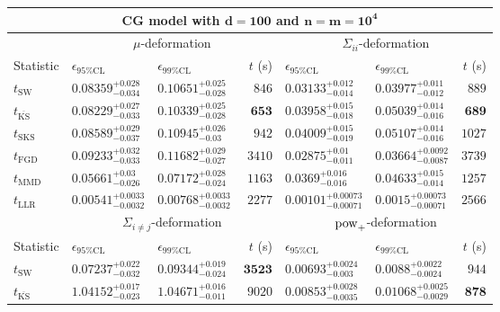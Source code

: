 \begin{tabular}{l|llr|llr}
	\toprule
	\multicolumn{7}{c}{{\bf CG model with $\mathbf{d=100}$ and $\mathbf{n=m=10^{4}}$}} \\
	\toprule
	\multicolumn{1}{c}{} & \multicolumn{3}{c}{$\mu$-deformation} & \multicolumn{3}{c}{$\Sigma_{ii}$-deformation} \\
	Statistic & $\epsilon_{95\%\mathrm{CL}}$ & $\epsilon_{99\%\mathrm{CL}}$ & $t$ (s) & $\epsilon_{95\%\mathrm{CL}}$ & $\epsilon_{99\%\mathrm{CL}}$ & $t$ (s) \\
	\midrule
	$t_{\mathrm{SW}}$ & $0.08359_{-0.034}^{+0.028}$ & $0.10651_{-0.028}^{+0.025}$ & $846$ & $0.03133_{-0.014}^{+0.012}$ & $0.03977_{-0.012}^{+0.011}$ & $889$ \\
	$t_{\overline{\mathrm{KS}}}$ & $0.08229_{-0.033}^{+0.027}$ & $0.10339_{-0.028}^{+0.025}$ & ${\mathbf{653}}$ & $0.03958_{-0.018}^{+0.015}$ & $0.05039_{-0.016}^{+0.014}$ & ${\mathbf{689}}$ \\
	$t_{\mathrm{SKS}}$ & $0.08589_{-0.037}^{+0.029}$ & $0.10945_{-0.03}^{+0.026}$ & $942$ & $0.04009_{-0.019}^{+0.015}$ & $0.05107_{-0.016}^{+0.014}$ & $1027$ \\
	$t_{\mathrm{FGD}}$ & $0.09233_{-0.033}^{+0.032}$ & $0.11682_{-0.027}^{+0.029}$ & $3410$ & ${\mathbf{0.02875_{-0.011}^{+0.01}}}$ & ${\mathbf{0.03664_{-0.0087}^{+0.0092}}}$ & $3739$ \\
	$t_{\mathrm{MMD}}$ & ${\mathbf{0.05661_{-0.026}^{+0.03}}}$ & ${\mathbf{0.07172_{-0.024}^{+0.028}}}$ & $1163$ & $0.0369_{-0.016}^{+0.016}$ & $0.04633_{-0.014}^{+0.015}$ & $1257$ \\
	$t_{\mathrm{LLR}}$ & $0.00541_{-0.0032}^{+0.0033}$ & $0.00768_{-0.0032}^{+0.0033}$ & $2277$ & $0.00101_{-0.00071}^{+0.00073}$ & $0.0015_{-0.00071}^{+0.00073}$ & $2566$ \\
	\toprule
	\multicolumn{1}{c}{} & \multicolumn{3}{c}{$\Sigma_{i\neq j}$-deformation} & \multicolumn{3}{c}{$\rm{pow}_{+}$-deformation} \\
	Statistic & $\epsilon_{95\%\mathrm{CL}}$ & $\epsilon_{99\%\mathrm{CL}}$ & $t$ (s) & $\epsilon_{95\%\mathrm{CL}}$ & $\epsilon_{99\%\mathrm{CL}}$ & $t$ (s) \\
	\midrule
	$t_{\mathrm{SW}}$ & $0.07237_{-0.032}^{+0.022}$ & $0.09344_{-0.024}^{+0.019}$ & ${\mathbf{3523}}$ & $0.00693_{-0.003}^{+0.0024}$ & $0.0088_{-0.0024}^{+0.0022}$ & $944$ \\
	$t_{\overline{\mathrm{KS}}}$ & $1.04152_{-0.023}^{+0.017}$ & $1.04671_{-0.011}^{+0.016}$ & $9020$ & $0.00853_{-0.0035}^{+0.0028}$ & $0.01068_{-0.0029}^{+0.0025}$ & ${\mathbf{878}}$ \\

\end{tabular}
